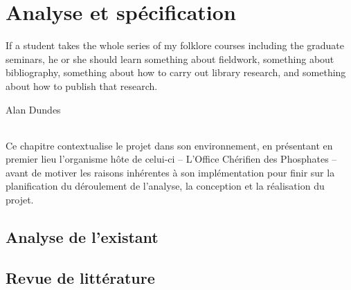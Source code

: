 \chapter{Analyse et spécification}
\epigraph{If a student takes the whole series of my folklore courses including the graduate seminars, he or she should learn something about fieldwork, something about bibliography, something about how to carry out library research, and something about how to publish that research.}{Alan Dundes}
\subparagraph{}
Ce chapitre contextualise le projet dans son environnement, en présentant en premier lieu l'organisme hôte de celui-ci – L'Office Chérifien des Phosphates – avant de motiver les raisons inhérentes à son implémentation pour finir sur la planification du déroulement de l'analyse, la conception et la réalisation du projet.
\cleardoublepage

\section{Analyse de l’existant}
\section{Revue de littérature}

